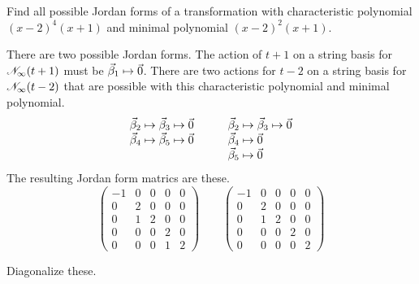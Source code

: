 \begin{exercises}
  \item 
    Find all possible Jordan forms of a transformation with characteristic
    polynomial \( (x-2)^4(x+1) \) and minimal polynomial \( (x-2)^2(x+1) \).
    \begin{answer}
      There are two possible Jordan forms.
      The action of $t+1$ on a string basis for $\mathscr{N}_\infty(t+1)$
      must be $\vec{\beta}_1\mapsto\vec{0}$.
      There are two actions for $t-2$ on a string basis for
      $\mathscr{N}_\infty(t-2)$ that are possible with this characteristic 
      polynomial and minimal polynomial.
      \begin{equation*}
        \begin{array}[t]{l}
          \vec{\beta}_2\mapsto\vec{\beta}_3\mapsto\vec{0}  \\
          \vec{\beta}_4\mapsto\vec{\beta}_5\mapsto\vec{0}  
        \end{array}        
        \qquad
        \begin{array}[t]{l}
          \vec{\beta}_2\mapsto\vec{\beta}_3\mapsto\vec{0}  \\
          \vec{\beta}_4\mapsto\vec{0}                      \\
          \vec{\beta}_5\mapsto\vec{0}                      
        \end{array}        
      \end{equation*}
      The resulting Jordan form matrics are these. 
      \begin{equation*}
        \begin{pmatrix}
          -1  &0  &0  &0  &0  \\
           0  &2  &0  &0  &0  \\
           0  &1  &2  &0  &0  \\
           0  &0  &0  &2  &0  \\
           0  &0  &0  &1  &2
        \end{pmatrix}
        \qquad
        \begin{pmatrix}
          -1  &0  &0  &0  &0  \\
           0  &2  &0  &0  &0  \\
           0  &1  &2  &0  &0  \\
           0  &0  &0  &2  &0  \\
           0  &0  &0  &0  &2
        \end{pmatrix}
     \end{equation*}  
    \end{answer}
  \recommended \item Diagonalize these.

\end{exercises}
